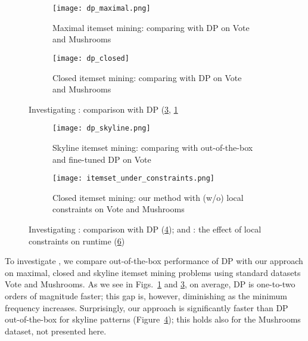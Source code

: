 \begin{figure}[tb]
  \centering
  \begin{subfigure}[t]{\textwidth}
  \centering
   \texttt{[image: dp\_maximal.png]}
   \caption{Maximal itemset mining: comparing with DP on Vote and Mushrooms}
    \label{fig:dp_maximal}
  \end{subfigure}
  \begin{subfigure}[t]{\textwidth}
  \centering
   \texttt{[image: dp\_closed]}
   \caption{Closed itemset mining: comparing with DP on Vote and Mushrooms}
    \label{fig:dp_closed}
  \end{subfigure}
\caption{Investigating \qtwo: comparison with DP \parencite{dp2013} (\ref{fig:dp_closed}, \ref{fig:dp_maximal}}
\end{figure}

\begin{figure}[tb]
  \centering
  \begin{subfigure}[t]{\textwidth}
  \centering
   \texttt{[image: dp\_skyline.png]}
   \caption{Skyline itemset mining: comparing with out-of-the-box and fine-tuned DP on Vote}
    \label{fig:dp_skyline}
  \end{subfigure}
  \begin{subfigure}[t]{\textwidth}
      \centering
   \texttt{[image: itemset\_under\_constraints.png]}
   \caption{Closed itemset mining: our method with (w/o) local constraints on Vote and Mushrooms}%
    \label{fig:local_constraints}
  \end{subfigure}
   \caption{Investigating \qtwo: comparison with DP \parencite{dp2013} (\ref{fig:dp_skyline}); and \qthree: the effect of local constraints on runtime (\ref{fig:local_constraints})}
\end{figure}


To investigate \qtwo, we compare out-of-the-box performance of DP \parencite{dp2013} with our approach on maximal, closed and skyline itemset mining problems using standard datasets Vote and Mushrooms. As we see in Figs.~\ref{fig:dp_maximal} and \ref{fig:dp_closed}, on average, DP is one-to-two orders of magnitude faster; this gap is, however, diminishing as the minimum frequency increases. %
Surprisingly, our approach is significantly faster than DP out-of-the-box for skyline patterns (Figure~\ref{fig:dp_skyline}); this holds also for the Mushrooms dataset, not presented here. 

